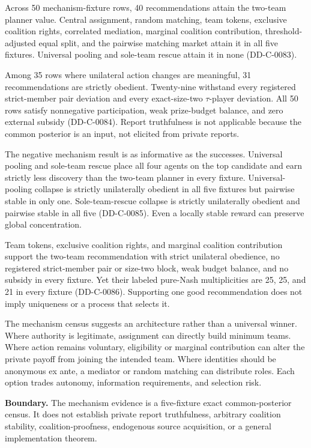 \documentclass[11pt]{article}
\newcommand{\Boundary}[1]{\par\noindent\textbf{Boundary.} #1\par}
\begin{document}


Across 50 mechanism-fixture rows, 40 recommendations attain the two-team
planner value. Central assignment, random matching, team tokens, exclusive
coalition rights, correlated mediation, marginal coalition contribution,
threshold-adjusted equal split, and the pairwise matching market attain it in
all five fixtures. Universal pooling and sole-team rescue attain it in none
(DD-C-0083).

Among 35 rows where unilateral action changes are meaningful, 31
recommendations are strictly obedient. Twenty-nine withstand every registered
strict-member pair deviation and every exact-size-two $\tau$-player deviation.
All 50 rows satisfy nonnegative participation, weak prize-budget balance, and
zero external subsidy (DD-C-0084). Report truthfulness is not applicable because
the common posterior is an input, not elicited from private reports.

The negative mechanism result is as informative as the successes. Universal
pooling and sole-team rescue place all four agents on the top candidate and
earn strictly less discovery than the two-team planner in every fixture.
Universal-pooling collapse is strictly unilaterally obedient in all five
fixtures but pairwise stable in only one. Sole-team-rescue collapse is strictly
unilaterally obedient and pairwise stable in all five (DD-C-0085). Even a
locally stable reward can preserve global concentration.

Team tokens, exclusive coalition rights, and marginal coalition contribution
support the two-team recommendation with strict unilateral obedience, no
registered strict-member pair or size-two block, weak budget balance, and no
subsidy in every fixture. Yet their labeled pure-Nash multiplicities are 25,
25, and 21 in every fixture (DD-C-0086). Supporting one good recommendation
does not imply uniqueness or a process that selects it.

The mechanism census suggests an architecture rather than a universal winner.
Where authority is legitimate, assignment can directly build minimum teams.
Where action remains voluntary, eligibility or marginal contribution can alter
the private payoff from joining the intended team. Where identities should be
anonymous ex ante, a mediator or random matching can distribute roles. Each
option trades autonomy, information requirements, and selection risk.

\Boundary{The mechanism evidence is a five-fixture exact common-posterior
census. It does not establish private report truthfulness, arbitrary coalition
stability, coalition-proofness, endogenous source acquisition, or a general
implementation theorem.}
\end{document}
